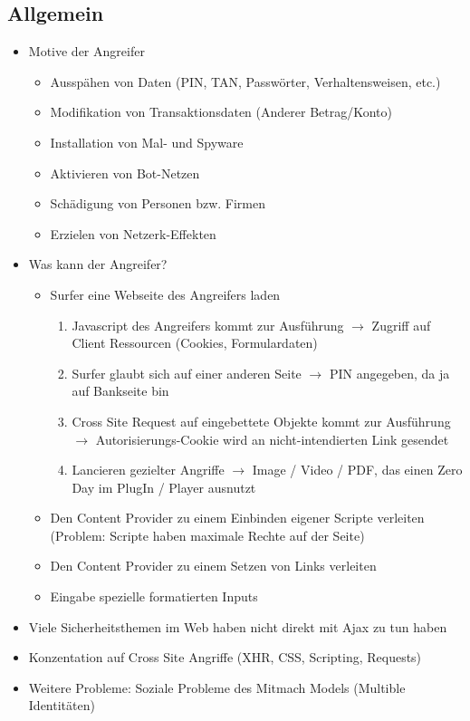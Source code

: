\documentclass{article} %
\begin{document}
	\subsection{Allgemein}
	\begin{itemize}
		\item Motive der Angreifer
		\begin{itemize}
			\item Ausspähen von Daten (PIN, TAN, Passwörter, Verhaltensweisen, etc.)
			\item Modifikation von Transaktionsdaten (Anderer Betrag/Konto)
			\item Installation von Mal- und Spyware
			\item Aktivieren von Bot-Netzen
			\item Schädigung von Personen bzw. Firmen
			\item Erzielen von Netzerk-Effekten
		\end{itemize}
		\item Was kann der Angreifer?
		\begin{itemize}
			\item Surfer eine Webseite des Angreifers laden
			\begin{enumerate}
				\item Javascript des Angreifers kommt zur Ausführung $\rightarrow$ Zugriff auf Client Ressourcen (Cookies, Formulardaten)
				\item Surfer glaubt sich auf einer anderen Seite $\rightarrow$ PIN angegeben, da ja auf Bankseite bin
				\item Cross Site Request auf eingebettete Objekte kommt zur Ausführung $\rightarrow$ Autorisierungs-Cookie wird an nicht-intendierten Link gesendet
				\item Lancieren gezielter Angriffe $\rightarrow$ Image / Video / PDF, das einen Zero Day im PlugIn / Player ausnutzt
			\end{enumerate}
			\item Den Content Provider zu einem Einbinden eigener Scripte verleiten (Problem: Scripte haben maximale Rechte auf der Seite)
			\item Den Content Provider zu einem Setzen von Links verleiten 
			\item Eingabe spezielle formatierten Inputs 
		\end{itemize}
		\item Viele Sicherheitsthemen im Web haben nicht direkt mit Ajax zu tun haben
		\item Konzentation auf Cross Site Angriffe (XHR, CSS, Scripting, Requests)
		\item Weitere Probleme: Soziale Probleme des Mitmach Models (Multible Identitäten)
	\end{itemize}
	
\end{document}

